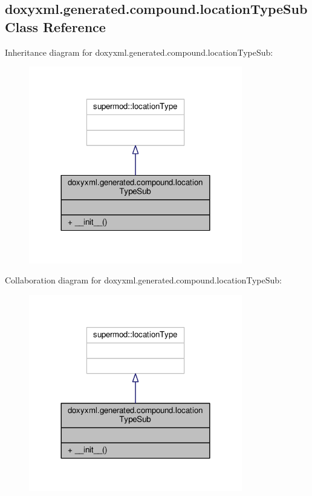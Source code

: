 \subsection{doxyxml.\+generated.\+compound.\+location\+Type\+Sub Class Reference}
\label{classdoxyxml_1_1generated_1_1compound_1_1locationTypeSub}


Inheritance diagram for doxyxml.\+generated.\+compound.\+location\+Type\+Sub\+:
\nopagebreak
\begin{figure}[H]
\begin{center}
\leavevmode
\includegraphics[width=264pt]{d1/d85/classdoxyxml_1_1generated_1_1compound_1_1locationTypeSub__inherit__graph}
\end{center}
\end{figure}


Collaboration diagram for doxyxml.\+generated.\+compound.\+location\+Type\+Sub\+:
\nopagebreak
\begin{figure}[H]
\begin{center}
\leavevmode
\includegraphics[width=264pt]{d7/d2d/classdoxyxml_1_1generated_1_1compound_1_1locationTypeSub__coll__graph}
\end{center}
\end{figure}
